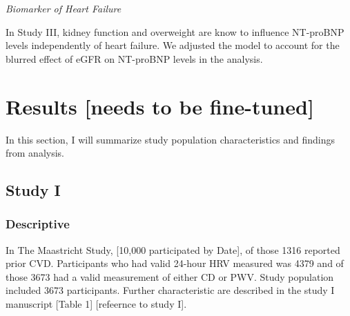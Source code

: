 \documentclass[
  a4paper,
  headsepline=true,
  open=any]{scrbook}
\begin{document}
\emph{Biomarker of Heart Failure}

In Study III, kidney function and overweight are know to influence
NT-proBNP levels independently of heart failure. We adjusted the model
to account for the blurred effect of eGFR on NT-proBNP levels in the
analysis.


\hypertarget{results-needs-to-be-fine-tuned}{%
\chapter{Results {[}needs to be
fine-tuned{]}}\label{results-needs-to-be-fine-tuned}}

In this section, I will summarize study population characteristics and
findings from analysis.

\hypertarget{study-i-1}{%
\section{Study I}\label{study-i-1}}

\hypertarget{descriptive}{%
\subsection{Descriptive}\label{descriptive}}

In The Maastricht Study, {[}10,000 participated by Date{]}, of those
1316 reported prior CVD. Participants who had valid 24-hour HRV measured
was 4379 and of those 3673 had a valid measurement of either CD or PWV.
Study population included 3673 participants. Further characteristic are
described in the study I manuscript {[}Table 1{]} {[}refeernce to study
I{]}.
\end{document}
